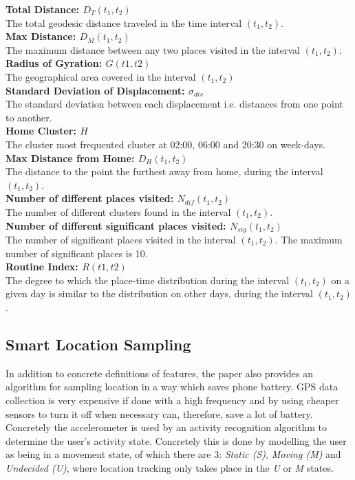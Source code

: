 \textbf{Total Distance: $D_T (t_1, t_2)$}\\
The total geodesic distance traveled in the time interval $(t_1, t_2)$.\\

\textbf{Max Distance: $D_M (t_1, t_2)$}\\
The maximum distance between any two places visited in the interval $(t_1, t_2)$.\\

\textbf{Radius of Gyration: $G(t1, t2)$}\\
The geographical area covered in the interval $(t_1, t_2)$\\

\textbf{Standard Deviation of Displacement: $\sigma_{dis}$}\\
The standard deviation between each displacement i.e. distances from one point to another.\\

\textbf{Home Cluster: $H$}\\
The cluster most frequented cluster at 02:00, 06:00 and 20:30 on week-days.\\

\textbf{Max Distance from Home: $D_H(t_1, t_2)$}\\
The distance to the point the furthest away from home, during the interval $(t_1, t_2)$.\\

\textbf{Number of different places visited: $N_{dif} (t_1, t_2)$}\\
The number of different clusters found in the interval $(t_1, t_2)$.\\

\textbf{Number of different significant places visited: $N_{sig} (t_1, t_2)$}\\
The number of significant places visited in the interval $(t_1, t_2)$. The maximum number of significant places is 10.\\

\textbf{Routine Index: $R(t1, t2)$}\\
The degree to which the place-time distribution during the interval $(t_1, t_2)$ on a given day is similar to the distribution on other days, during the interval $(t_1, t_2)$.\\

\subsection{Smart Location Sampling}
In addition to concrete definitions of features, the paper also provides an algorithm for sampling location in a way which saves phone battery. GPS data collection is very expensive if done with a high frequency and by using cheaper sensors to turn it off when necessary can, therefore, save a lot of battery. Concretely the accelerometer is used by an activity recognition algorithm to determine the user's activity state. Concretely this is done by modelling the user as being in a movement state, of which there are 3: \textit{Static (S)}, \textit{Moving (M)} and \textit{Undecided (U)}, where location tracking only takes place in the \textit{U} or \textit{M} states. \\

